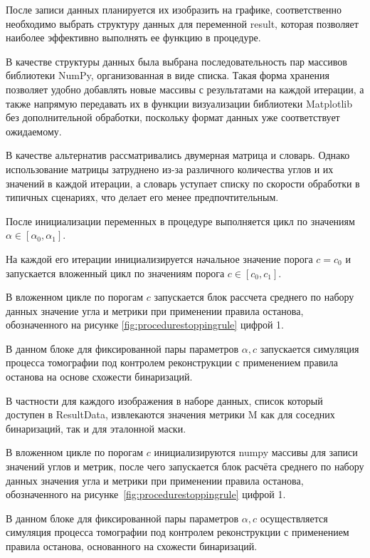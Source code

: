 После записи данных планируется их изобразить на графике, соответственно необходимо выбрать структуру данных для переменной result, которая позволяет наиболее эффективно выполнять ее функцию в процедуре.

В качестве структуры данных была выбрана последовательность пар массивов библиотеки NumPy, организованная в виде списка. Такая форма хранения позволяет удобно добавлять новые массивы с результатами на каждой итерации, а также напрямую передавать их в функции визуализации библиотеки Matplotlib без дополнительной обработки, поскольку формат данных уже соответствует ожидаемому.

В качестве альтернатив рассматривались двумерная матрица и словарь. Однако использование матрицы затруднено из-за различного количества углов и их значений в каждой итерации, а словарь уступает списку по скорости обработки в типичных сценариях, что делает его менее предпочтительным.

После инициализации переменных в процедуре выполняется цикл по значениям \(\alpha \in [\alpha_0, \alpha_1]\).

На каждой его итерации инициализируется начальное значение порога \(c = c_0\) и запускается вложенный цикл по значениям порога \(c \in [c_0, c_1]\).

В вложенном цикле по порогам \(c\) запускается блок рассчета среднего по набору данных значение угла и метрики при применении правила останова, обозначенного на рисунке \ref*{fig:procedurestoppingrule} цифрой 1.

В данном блоке для фиксированной пары параметров \(\alpha, c\) запускается симуляция процесса томографии под контролем реконструкции с применением правила останова на основе схожести бинаризаций.

В частности для каждого изображения в наборе данных, список который доступен в ResultData, извлекаются значения метрики M как для соседних бинаризаций, так и для эталонной маски.

В вложенном цикле по порогам \(c\) инициализируются numpy массивы для записи значений углов и метрик, после чего запускается блок расчёта среднего по набору данных значения угла и метрики при применении правила останова, обозначенного на рисунке~\ref*{fig:procedurestoppingrule} цифрой 1.

В данном блоке для фиксированной пары параметров \(\alpha, c\) осуществляется симуляция процесса томографии под контролем реконструкции с применением правила останова, основанного на схожести бинаризаций.

